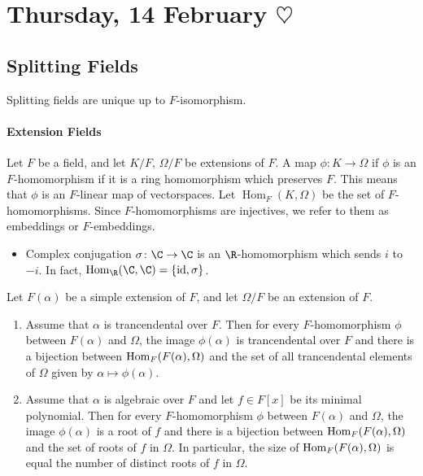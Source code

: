 
\section{Thursday, 14 February \texorpdfstring{$\heartsuit$}{<3}}

\subsection{Splitting Fields}

Splitting fields are unique up to $F$-isomorphism.

\paragraph*{Extension Fields} Let $F$ be a field, and let $K/F$, $\Omega/F$ be extensions of $F$. A map $\phi\colon K\to \Omega$ if $\phi$ is an $F$-homomorphism if it is a ring homomorphism which preserves $F$. This means that $\phi$ is an $F$-linear map of vectorspaces. Let $\operatorname{Hom}_F(K, \Omega)$ be the set of $F$-homomorphisms. Since $F$-homomorphisms are injectives, we refer to them as embeddings or $F$-embeddings.

\begin{example} \leavevmode
\begin{itemize}
\item Complex conjugation $\sigma\colon \C \to \C$ is an $\R$-homomorphism which sends $i$ to $-i$. In fact, $\operatorname{Hom}_\R(\C,\C) = \{\operatorname{id}, \sigma\}$.
\end{itemize}
\end{example}

\begin{theorem}
Let $F(\alpha)$ be a simple extension of $F$, and let $\Omega/F$ be an extension of $F$.
\begin{enumerate}[label={\textup{(\alph*)}}]
\item Assume that $\alpha$ is trancendental over $F$. Then for every $F$-homomorphism $\phi$ between $F(\alpha)$ and\/ $\Omega$, the image $\phi(\alpha)$ is trancendental over $F$ and there is a bijection between $\operatorname{Hom}_{F}(F(\alpha), \Omega)$ and the set of all trancendental elements of\/ $\Omega$ given by $\alpha \mapsto \phi(\alpha)$. 
\item Assume that $\alpha$ is algebraic over $F$ and let $f \in F[x]$ be its minimal polynomial. Then for every $F$-homomorphism $\phi$ between $F(\alpha)$ and\/ $\Omega$, the image $\phi(\alpha)$ is a root of $f$ and there is a bijection between $\operatorname{Hom}_F(F(\alpha), \Omega)$ and the set of roots of $f$ in $\Omega$. In particular, the size of\/ $\operatorname{Hom}_F(F(\alpha), \Omega)$ is equal the number of distinct roots of $f$ in $\Omega$.
\end{enumerate}
\end{theorem}

